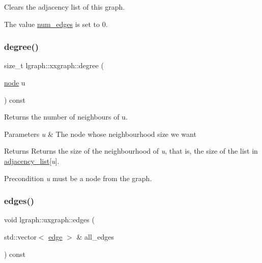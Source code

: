Clears the adjacency list of this graph. 

The value \hyperlink{classlgraph_1_1xxgraph_a6765a9a3be42f6e0f824635c593b35d7}{num\+\_\+edges} is set to 0. \mbox{\label{classlgraph_1_1xxgraph_a20ebc2927ee8fb8bb0a2c3b448d9ed78}} 
\subsubsection{\texorpdfstring{degree()}{degree()}}
{\footnotesize\ttfamily size\+\_\+t lgraph\+::xxgraph\+::degree (\begin{DoxyParamCaption}\item[{\hyperlink{namespacelgraph_a397169dd66adf725210a30fb7251773e}{node}}]{u }\end{DoxyParamCaption}) const\hspace{0.3cm}{\ttfamily [inherited]}}



Returns the number of neighbours of u. 


\begin{DoxyParams}{Parameters}
{\em u} & The node whose neighbourhood size we want \\
\hline
\end{DoxyParams}
\begin{DoxyReturn}{Returns}
Returns the size of the neighbourhood of {\itshape u}, that is, the size of the list in \hyperlink{classlgraph_1_1xxgraph_a31cf82d0b20be05290be259dc97a51ec}{adjacency\+\_\+list}\mbox{[}{\itshape u}\mbox{]}. 
\end{DoxyReturn}
\begin{DoxyPrecond}{Precondition}
{\itshape u} must be a node from the graph. 
\end{DoxyPrecond}
\mbox{\label{classlgraph_1_1uxgraph_abf4c5ce2b595780e6ba80f06bdd0be16}} 
\subsubsection{\texorpdfstring{edges()}{edges()}}
{\footnotesize\ttfamily void lgraph\+::uxgraph\+::edges (\begin{DoxyParamCaption}\item[{std\+::vector$<$ \hyperlink{namespacelgraph_a76bd7d50719f03de7a85db259d80d572}{edge} $>$ \&}]{all\+\_\+edges }\end{DoxyParamCaption}) const}



